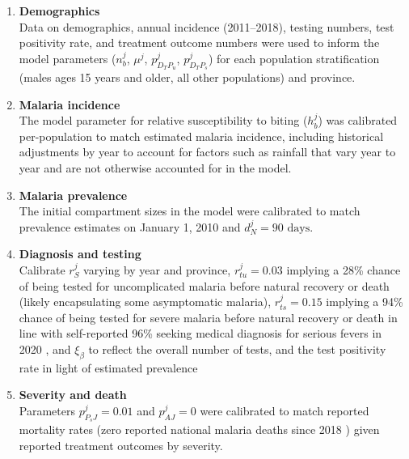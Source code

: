 \documentclass[doublespacing]{bmcart}
\newcommand{\males}{males ages 15 years and older}
\newcommand{\gen}{all other populations}
\begin{document}
\begin{enumerate}
    \item \textbf{Demographics} \\ Data on demographics, annual incidence (2011--2018), testing numbers, test positivity rate, and treatment outcome numbers were used to inform the model parameters ($n_b^j$, $\mu^j$, $p_{{D_T}{P_u}}^j$, $p_{{D_T}{P_s}}^j$) for each population stratification (\males, \gen) and province.
    \item  \textbf{Malaria incidence} \\  The model parameter for relative susceptibility to biting ($h_b^j$) was calibrated per-population to match estimated malaria incidence, including historical adjustments by year to account for factors such as rainfall that vary year to year and are not otherwise accounted for in the model.
    \item  \textbf{Malaria prevalence} \\ The initial compartment sizes in the model were calibrated to match prevalence estimates on January 1, 2010 and $d_N^j=\text{90 days}$.
    \item  \textbf{Diagnosis and testing} \\ Calibrate $r_S^j$ varying by year and province, $r_{tu}^j=0.03$ implying a 28\% chance of being tested for uncomplicated malaria before natural recovery or death (likely encapsulating some asymptomatic malaria), $r_{ts}^j=0.15$ implying a 94\% chance of being tested for severe malaria before natural recovery or death in line with self-reported 96\% seeking medical diagnosis for serious fevers in 2020 \cite{kheang2021cambodia}, and $\xi_\beta$ to reflect the overall number of tests, and the test positivity rate in light of estimated prevalence
    \item  \textbf{Severity and death} \\ Parameters $p_{P_sJ}^j=0.01$ and $p_{AJ}^j=0$ were calibrated to match reported mortality rates (zero reported national malaria deaths since 2018 \cite{WHOmalaria2021}) given reported treatment outcomes by severity.
\end{enumerate}
\end{document}

